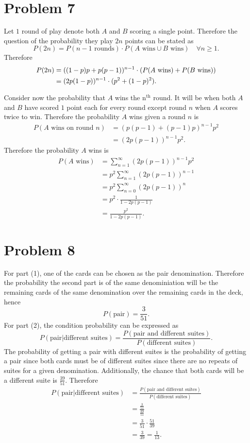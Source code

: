\documentclass[12pt]{extarticle}
\begin{document}
\section*{Problem 7}
Let $1$ round of play denote both $A$ and $B$ scoring a single point. Therefore the question of the probability they play $2n$ points can be stated as
\[
	P(2n) = P(n-1\text{ rounds}) \cdot P(A\text{ wins} \cup B\text{ wins}) \quad \forall n \geq 1
.\]
Therefore
\begin{align*}
	P(2n) &= ((1-p)p + p(p-1))^{n-1} \cdot \qty(P(A\text{ wins}) + P(B\text{ wins})) \\
				&= (2p(1-p))^{n-1} \cdot (p^2 + (1-p)^2)
.\end{align*}

Consider now the probability that $A$ wins the $\text{n}^\text{th}$ round. It will be when both $A$ and $B$ have scored $1$ point each for every round except round $n$ when $A$ scores twice to win. Therefore the probability $A$ wins given a round $n$ is
\begin{align*}
	P(A\text{ wins on round }n) &= (p(p-1) + (p-1)p)^{n-1} p^2 \\
															&= (2p(p-1))^{n-1} p^2
.\end{align*}
Therefore the probability $A$ wins is
\begin{align*}
	P(A\text{ wins}) &= \sum_{n=1}^\infty (2p(p-1))^{n-1} p^2 \\
					  &= p^2 \sum_{n=1}^\infty (2p(p-1))^{n-1} \\
					  &= p^2 \sum_{n=0}^\infty (2p(p-1))^n \\
						&= p^2 \cdot\frac{1}{1 - 2p(p-1)} \\
						&= \frac{p^2}{1 - 2p(p-1)}
.\end{align*}

\section*{Problem 8}
For part (1), one of the cards can be chosen as the pair denomination. Therefore the probability the second part is of the same denominiation will be the remaining cards of the same denomination over the remaining cards in the deck, hence
\[
	P(\text{pair}) = \frac{3}{51}
.\]
For part (2), the condition probability can be expressed as
\[
	P(\text{pair}|\text{different suites}) = \frac{P(\text{pair and different suites})}{P(\text{different suites})}
.\]
The probability of getting a pair with different suites is the probability of getting a pair since both cards must be of different suites since there are no repeats of suites for a given denomination. Additionally, the chance that both cards will be a different suite is $\frac{39}{51}$. Therefore
\begin{align*}
	P(\text{pair}|\text{different suites}) &= \frac{P(\text{pair and different suites})}{P(\text{different suites})} \\
																				 &= \frac{\frac{3}{51}}{\frac{39}{51}} \\
																				 &= \frac{3}{51}\cdot\frac{51}{39} \\
																				 &= \frac{3}{39}
																				 = \frac{1}{13}
.\end{align*}
\end{document}
